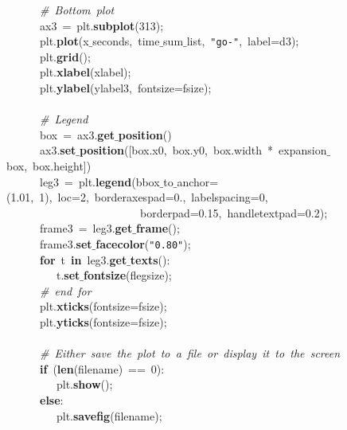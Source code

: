 \mbox{}\ \ \ \ \ \ \textit{\#\ Bottom\ plot} \\
\mbox{}\ \ \ \ \ \ ax3\ =\ plt.\textbf{subplot}(313); \\
\mbox{}\ \ \ \ \ \ plt.\textbf{plot}(x$\_$seconds,\ time$\_$sum$\_$list,\ \texttt{"{}go-"{}},\ label=d3); \\
\mbox{}\ \ \ \ \ \ plt.\textbf{grid}(); \\
\mbox{}\ \ \ \ \ \ plt.\textbf{xlabel}(xlabel); \\
\mbox{}\ \ \ \ \ \ plt.\textbf{ylabel}(ylabel3,\ fontsize=fsize); \\
\mbox{}\ \ \ \ \ \  \\
\mbox{}\ \ \ \ \ \ \textit{\#\ Legend} \\
\mbox{}\ \ \ \ \ \ box\ =\ ax3.\textbf{get$\_$position}() \\
\mbox{}\ \ \ \ \ \ ax3.\textbf{set$\_$position}([box.x0,\ box.y0,\ box.width\ *\ expansion$\_$box,\ box.height]) \\
\mbox{}\ \ \ \ \ \ leg3\ =\ plt.\textbf{legend}(bbox$\_$to$\_$anchor=(1.01,\ 1),\ loc=2,\ borderaxespad=0.,\ labelspacing=0,\  \\
\mbox{}\ \ \ \ \ \ \ \ \ \ \ \ \ \ \ \ \ \ \ \ \ \ \ \ borderpad=0.15,\ handletextpad=0.2); \\
\mbox{}\ \ \ \ \ \ frame3\ =\ leg3.\textbf{get$\_$frame}(); \\
\mbox{}\ \ \ \ \ \ frame3.\textbf{set$\_$facecolor}(\texttt{"{}0.80"{}}); \\
\mbox{}\ \ \ \ \ \ \textbf{for}\ t\ \textbf{in}\ leg3.\textbf{get$\_$texts}(): \\
\mbox{}\ \ \ \ \ \ \ \ \ t.\textbf{set$\_$fontsize}(flegsize); \\
\mbox{}\ \ \ \ \ \ \textit{\#\ end\ for} \\
\mbox{}\ \ \ \ \ \ plt.\textbf{xticks}(fontsize=fsize); \\
\mbox{}\ \ \ \ \ \ plt.\textbf{yticks}(fontsize=fsize); \\
\mbox{}\ \ \ \ \ \  \\
\mbox{}\ \ \ \ \ \ \textit{\#\ Either\ save\ the\ plot\ to\ a\ file\ or\ display\ it\ to\ the\ screen} \\
\mbox{}\ \ \ \ \ \ \textbf{if}\ (\textbf{len}(filename)\ ==\ 0): \\
\mbox{}\ \ \ \ \ \ \ \ \ plt.\textbf{show}(); \\
\mbox{}\ \ \ \ \ \ \textbf{else}: \\
\mbox{}\ \ \ \ \ \ \ \ \ plt.\textbf{savefig}(filename); \\
